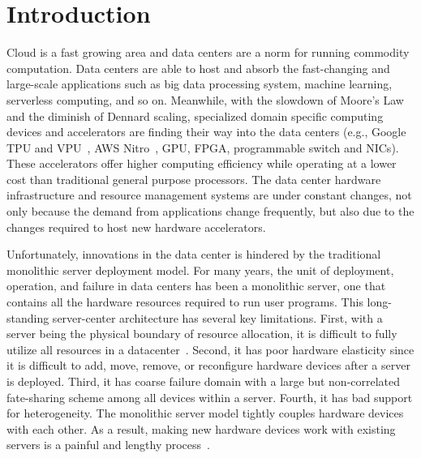 \chapter{Introduction}

Cloud is a fast growing area and data centers are a norm for running commodity computation.
%
Data centers are able to host and absorb the fast-changing and large-scale applications such as big data processing system, machine learning, serverless computing, and so on.
%
Meanwhile, with the slowdown of Moore's Law and the diminish of Dennard scaling, 
specialized domain specific computing devices and accelerators are finding their
way into the data centers (e.g., Google TPU and VPU~\cite{TPU,VPU}, AWS Nitro~\cite{aws-nitro}, GPU, FPGA, programmable switch and NICs). These accelerators offer higher computing efficiency
while operating at a lower cost than traditional general purpose processors.
%
The data center hardware infrastructure and resource management systems are under constant changes, not only because the demand from applications change frequently, but also due to the changes required to host new hardware accelerators.


Unfortunately, innovations in the data center is hindered by the traditional monolithic server deployment model.
For many years, the unit of deployment, operation, and failure in data centers
has been a monolithic server, one that contains all the hardware resources required to run user programs. 
%
This long-standing server-center architecture has several key limitations.
First, with a server being the physical boundary of resource allocation, it is difficult to fully utilize all resources in a datacenter~\cite{LegoOS}.
Second, it has poor hardware elasticity since it is difficult to add, move, remove, or reconfigure hardware devices after a server is deployed.
Third, it has coarse failure domain with a large but non-correlated fate-sharing scheme among all devices within a server.
Fourth, it has bad support for heterogeneity. The monolithic server model
tightly couples hardware devices with each other.
As a result, making new hardware devices work with existing servers is a painful and lengthy process~\cite{Putnam14-FPGA}.

